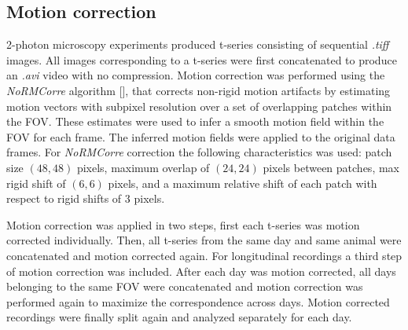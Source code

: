 \subsection{Motion correction}
2-photon microscopy experiments produced t-series consisting of sequential \textit{.tiff} images. 
All images corresponding to a t-series were first concatenated to produce an \textit{.avi} video with no compression.
Motion correction was performed using the \textit{NoRMCorre} algorithm [\cite{pnevmatikakis2017}], that corrects non-rigid motion artifacts by estimating motion vectors with subpixel resolution over a set of overlapping patches within the FOV. 
These estimates were used to infer a smooth motion field within the FOV for each frame. 
The inferred motion fields were applied to the original data frames.
For \textit{NoRMCorre} correction  the following characteristics was used: patch size $(48,48)$ pixels, maximum overlap of $(24,24)$ pixels between patches, max rigid shift of $(6,6)$ pixels, and a maximum relative shift of each patch with respect to rigid shifts of 3 pixels.  

Motion correction was applied in two steps, first each t-series was motion corrected individually.
Then, all t-series from the same day and same animal were concatenated and motion corrected again.
For longitudinal recordings a third step of motion correction was included.
After each day was motion corrected, all days belonging to the same FOV were concatenated and motion correction was performed again to maximize the correspondence across days. 
Motion corrected recordings were finally split again and analyzed separately for each day.
